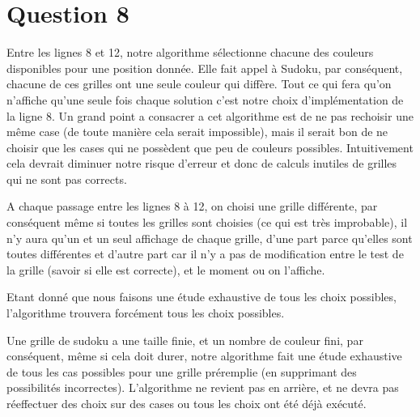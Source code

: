 
\section{Question 8}

Entre les lignes 8 et 12, notre algorithme s\'electionne chacune des couleurs disponibles pour une position donn\'ee. Elle fait appel \`a Sudoku, par cons\'equent, chacune de ces grilles ont une seule couleur qui diff\`ere. Tout ce qui fera qu'on n'affiche qu'une seule fois chaque solution c'est notre choix d'impl\'ementation de la ligne 8. Un grand point a consacrer a cet algorithme est de ne pas rechoisir une m\^eme case (de toute mani\`ere cela serait impossible), mais il serait bon de ne choisir que les cases qui ne poss\`edent que peu de couleurs possibles. Intuitivement cela devrait diminuer notre risque d'erreur et donc de calculs inutiles de grilles qui ne sont pas corrects.

A chaque passage entre les lignes 8 \`a 12, on choisi une grille diff\'erente, par cons\'equent m\^eme si toutes les grilles sont choisies (ce qui est tr\`es improbable), il n'y aura qu'un et un seul affichage de chaque grille, d'une part parce qu'elles sont toutes diff\'erentes et d'autre part car il n'y a pas de modification entre le test de la grille (savoir si elle est correcte), et le moment ou on l'affiche.

\bigskip
Etant donn\'e que nous faisons une \'etude exhaustive de tous les choix possibles, l'algorithme trouvera forc\'ement tous les choix possibles.

\bigskip
Une grille de sudoku a une taille finie, et un nombre de couleur fini, par cons\'equent, m\^eme si cela doit durer, notre algorithme fait une \'etude exhaustive de tous les cas possibles pour une grille pr\'eremplie (en supprimant des possibilit\'es incorrectes). L'algorithme ne revient pas en arri\`ere, et ne devra pas r\'eeffectuer des choix sur des cases ou tous les choix ont \'et\'e d\'ej\`a ex\'ecut\'e.